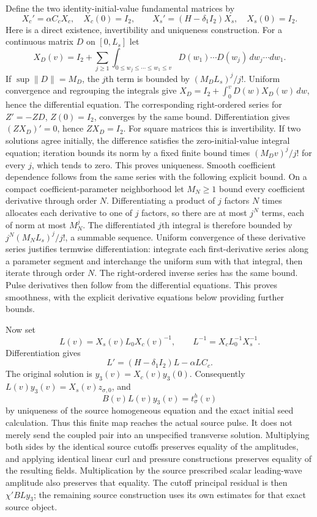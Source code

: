 Define the two identity-initial-value fundamental matrices by
\[
 X_c'=\alpha C_cX_c,\quad X_c(0)=I_2,\qquad
 X_s'=(H-\delta_1I_2)X_s,\quad X_s(0)=I_2.
\]
Here is a direct existence, invertibility and uniqueness construction.
For a continuous matrix $D$ on $[0,L_s]$ let
\[
 X_D(v)=I_2+
 \sum_{j\ge1}\int_{0\le w_j\le\cdots\le w_1\le v}
       D(w_1)\cdots D(w_j)\,dw_j\cdots dw_1 .
\]
If $\sup\|D\|=M_D$, the $j$th term is bounded by
$(M_DL_s)^j/j!$. Uniform convergence and regrouping the integrals
give $X_D=I_2+\int_0^vD(w)X_D(w)\,dw$, hence the differential
equation. The corresponding right-ordered series for
$Z'=-ZD$, $Z(0)=I_2$, converges by the same bound.
Differentiation gives $(ZX_D)'=0$, hence $ZX_D=I_2$.
For square matrices this is invertibility. If two solutions agree
initially, the difference satisfies the zero-initial-value integral
equation; iteration bounds its norm by a fixed finite bound times
$(M_Dv)^j/j!$ for every $j$, which tends to zero.
This proves uniqueness. Smooth coefficient dependence follows from
the same series with the following explicit bound. On a compact
coefficient-parameter neighborhood let $M_N\ge1$ bound every coefficient
derivative through order $N$. Differentiating a product of $j$ factors
$N$ times allocates each derivative to one of $j$ factors, so there are
at most $j^N$ terms, each of norm at most $M_N^j$. The differentiated
$j$th integral is therefore bounded by
$j^N(M_NL_s)^j/j!$, a summable sequence. Uniform convergence of these
derivative series justifies termwise differentiation: integrate each
first-derivative series along a parameter segment and interchange the
uniform sum with that integral, then iterate through order $N$.
The right-ordered inverse series has the same bound. Pulse derivatives
then follow from the differential equations. This proves smoothness,
with the explicit derivative equations below providing further bounds.

Now set
\begin{equation}\label{tgframe:intertwiner}
 L(v)=X_s(v)L_0X_c(v)^{-1},\qquad
 L^{-1}=X_cL_0^{-1}X_s^{-1}.
\end{equation}
Differentiation gives
\[
 L'=(H-\delta_1I_2)L-\alpha LC_c.
\]
The original solution is $y_3(v)=X_c(v)y_3(0)$.
Consequently $L(v)y_3(v)=X_s(v)z_{\sigma,0}$, and
\begin{equation}\label{tgframe:exactpulsematch}
 B(v)L(v)y_3(v)=t^h_\sigma(v)
\end{equation}
by uniqueness of the source homogeneous equation and the exact initial
seed calculation. Thus this finite map reaches the actual source pulse.
It does not merely send the coupled pair into an unspecified transverse
solution. Multiplying both sides by the identical source cutoffs
preserves equality of the amplitudes, and applying identical linear
curl and pressure constructions preserves equality of the resulting
fields. Multiplication by the source prescribed scalar leading-wave
amplitude also preserves that equality. The cutoff principal residual
is then $\chi'BLy_3$; the remaining source construction uses its own
estimates for that exact source object.

